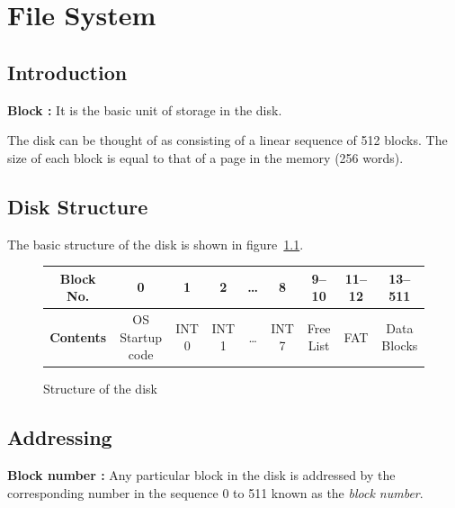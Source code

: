 \chapter{File System}
\label{chp:fs}

\section{Introduction}
\begin{defn}
	\textbf{Block :} It is the basic unit of storage in the disk.
\end{defn}
	
The disk can be thought of as consisting of a linear sequence of 512 blocks.
The size of each block is equal to that of a page in the memory (256 words). 

\section{Disk Structure}
The basic structure of the disk is shown in figure~\ref{fig:disk}.

\begin{figure}[htp!] \small
	\centering
	\begin{tabular}{|c||c|c|c|c|c|c|c|c|}
		\hline
		\textbf{Block No.} & 0 & 1 & 2 & \ldots & 8 & 9--10 & 11--12 & 13--511 \\ \hline
		\textbf{Contents} & OS Startup code & INT 0 & INT 1 & \ldots & INT 7 & Free List & FAT & Data Blocks \\ \hline
	\end{tabular}
	\caption{Structure of the disk}
	\label{fig:disk}
\end{figure}

\section{Addressing}
\begin{defn}	
	\textbf{Block number :} Any particular block in the disk is addressed by the corresponding number in the sequence 0 to 511 known as the \emph{block number}.
\end{defn}

